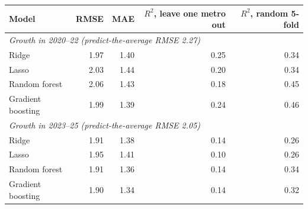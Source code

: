 \footnotesize\setlength{\tabcolsep}{4pt}
\begin{tabular}{lrrrr}
\toprule
Model & RMSE & MAE & \shortstack[r]{$R^2$, leave\\one metro out} & \shortstack[r]{$R^2$, random\\5-fold} \\
\midrule
\multicolumn{5}{l}{\textit{Growth in 2020--22 (predict-the-average RMSE 2.27)}} \\
Ridge & 1.97 & 1.40 & 0.25 & 0.34 \\
Lasso & 2.03 & 1.44 & 0.20 & 0.34 \\
Random forest & 2.06 & 1.43 & 0.18 & 0.45 \\
Gradient boosting & 1.99 & 1.39 & 0.24 & 0.46 \\
\multicolumn{5}{l}{\textit{Growth in 2023--25 (predict-the-average RMSE 2.05)}} \\
Ridge & 1.91 & 1.38 & 0.14 & 0.26 \\
Lasso & 1.95 & 1.41 & 0.10 & 0.26 \\
Random forest & 1.91 & 1.36 & 0.14 & 0.34 \\
Gradient boosting & 1.90 & 1.34 & 0.14 & 0.32 \\
\bottomrule
\end{tabular}
